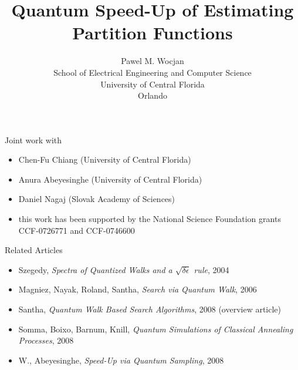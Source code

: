\documentclass[slideColor]{prosper}
\title{Quantum Speed-Up of Estimating Partition Functions}
\author{Pawel M. Wocjan\\[1ex]School of Electrical Engineering and Computer Science\\ University of Central Florida\\Orlando}
\renewcommand{\>}{\rangle}
\newcommand{\<}{\langle}
\begin{document}
\maketitle


\begin{slide}{Joint work with}
\begin{itemize}
\item Chen-Fu Chiang (University of Central Florida)

\bigskip
\item Anura Abeyesinghe (University of Central Florida)

\bigskip
\item Daniel Nagaj (Slovak Academy of Sciences)

\bigskip\bigskip
\item this work has been supported by the National Science Foundation
grants CCF-0726771 and CCF-0746600
\end{itemize}
\end{slide}


\begin{slide}{Related Articles}
\begin{itemize}
\item Szegedy, {\em Spectra of Quantized Walks and a $\sqrt{\delta\epsilon}$ rule}, 2004

\medskip
\item Magniez, Nayak, Roland, Santha, {\em Search via Quantum Walk}, 2006

\medskip
\item Santha, {\em Quantum Walk Based Search Algorithms}, 2008
(overview article)

\medskip
\item Somma, Boixo, Barnum, Knill, {\em Quantum Simulations of Classical Annealing Processes}, 2008

\medskip
\item W., Abeyesinghe, {\em Speed-Up via Quantum Sampling}, 2008
\end{itemize}

\end{slide}

\end{document}
